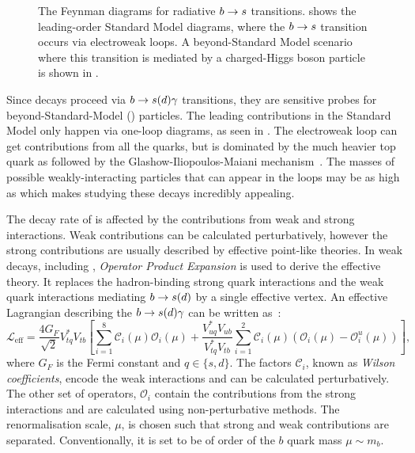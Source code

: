 \begin{figure}[htbp!]
\resizebox{0.66\textwidth}{!}{
    \subcaptionbox{\label{fig:sm_diagrams}}{
        
        
    }
}
\resizebox{0.33\textwidth}{!}{
\subcaptionbox{\label{fig:bsm_diagrams}}{
    
}
}
\caption{\label{fig:b_to_s_gamma_diagrams}
The Feynman diagrams for radiative $b\rightarrow s$ transitions. 
 shows the leading-order Standard Model diagrams, where the $b\rightarrow s$ transition occurs via electroweak loops.
A beyond-Standard Model scenario where this transition is mediated by a charged-Higgs boson particle is shown in .
}
\end{figure}

Since \BtoXsdgamma decays proceed via $b\rightarrow s(d)\gamma$ transitions, they are sensitive probes for beyond-Standard-Model (\BSM) particles. 
The leading contributions in the Standard Model only happen via one-loop diagrams, as seen in .
The electroweak loop can get contributions from all the quarks, but is dominated by the much heavier top quark \cite{Mannel:2001vn} as followed by the Glashow-Iliopoulos-Maiani mechanism~\cite{Glashow:1970gm}. 
The masses of possible \BSM weakly-interacting particles that can appear in the loops may be as high as  \cite{Misiak:2020vlo} which makes studying these decays incredibly appealing.

The decay rate of \BtoXsdgamma is affected by the contributions from weak and strong interactions.
Weak contributions can be calculated perturbatively, however the strong contributions are usually described by effective point-like theories.
In weak decays, including \BtoXsdgamma, \textit{Operator Product Expansion} \cite{Peskin:1995ev,Buras:1998raa} is used to derive the effective theory.
It replaces the hadron-binding strong quark interactions and the weak quark interactions mediating $b\rightarrow s(d)$ by a single effective vertex.
An effective Lagrangian describing the $b\rightarrow s(d)\gamma$ can be written as~\cite{Kaminski:2012eb,Misiak:2015xwa}:
\begin{equation}\label{eq:effective_lagrangian}
    \mathcal{L}_{\mathrm{eff}} = \frac{4G_F}{\sqrt{2}}V_{tq}^*V_{tb}\left[\sum^{8}_{i=1}\mathcal{C}_i(\mu)\mathcal{O}_i(\mu)
                                                + \frac{V^*_{uq}V_{ub}}{V^*_{tq}V_{tb}}\sum^{2}_{i=1}\mathcal{C}_i(\mu)(\mathcal{O}_i(\mu)-\mathcal{O}_i^u(\mu))\right],
\end{equation}
where $G_F$ is the Fermi constant and $q\in\{s,d\}$.
The factors $\mathcal{C}_i$, known as \textit{Wilson coefficients}, encode the weak interactions and can be calculated perturbatively.
The other set of operators, $\mathcal{O}_i$ contain the contributions from the strong interactions and are calculated using non-perturbative methods.
The renormalisation scale, $\mu$, is chosen such that strong and weak contributions are separated.
Conventionally, it is set to be of order of the $b$ quark mass $\mu\sim m_b$.

